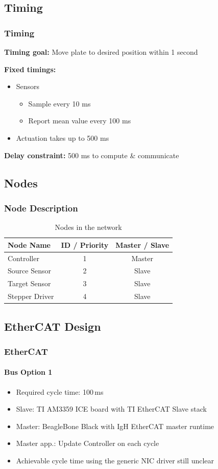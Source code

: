\documentclass{beamer}
\begin{document}
\subsection{Timing}
\begin{frame}
  \frametitle{Timing}
  \textbf{Timing goal:} Move plate to desired position within 1 second

  \vfill

  \textbf{Fixed timings:}
  \begin{itemize}
    \item Sensors
      \begin{itemize}
        \item Sample every 10 ms
        \item Report mean value every 100 ms
      \end{itemize}
    \item Actuation takes up to 500 ms
  \end{itemize}

  \vfill

  \textbf{Delay constraint:} 500 ms to compute \& communicate
\end{frame}

\subsection{Nodes}
\begin{frame}
  \frametitle{Node Description}
  \begin{table}
\begin{tabular}{l | c | c }
Node Name & ID / Priority & Master / Slave \\
\hline \hline
Controller & 1 & Master \\
Source Sensor & 2 & Slave \\
Target Sensor & 3 & Slave \\
Stepper Driver & 4 & Slave
\end{tabular}
\caption{Nodes in the network}
\end{table}
\end{frame}

\subsection{EtherCAT Design}
\begin{frame}
  \frametitle{EtherCAT}
  \framesubtitle{Bus Option 1}
  \begin{itemize}
    \item Required cycle time: 100\,ms
    \item Slave: TI AM3359 ICE board with TI EtherCAT Slave stack
    \item Master: BeagleBone Black with IgH EtherCAT master runtime
    \item Master app.: Update Controller on each cycle
    \item Achievable cycle time using the generic NIC driver still unclear
  \end{itemize}
\end{frame}
\end{document}
